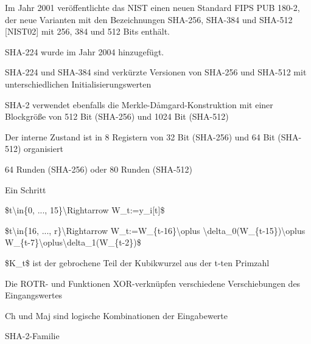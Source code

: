 \documentclass[a4paper]{article}
\begin{document}
\begin{multicols}{3}
\begin{itemize*}
            \begin{itemize*}
                  \item Im Jahr 2001 veröffentlichte das NIST einen neuen Standard FIPS PUB 180-2, der neue Varianten mit den Bezeichnungen SHA-256, SHA-384 und SHA-512 {[}NIST02{]} mit 256, 384 und 512 Bits enthält.
                  \begin{itemize*} \item SHA-224 wurde im Jahr 2004 hinzugefügt. \end{itemize*}
                  \item SHA-224 und SHA-384 sind verkürzte Versionen von SHA-256 und SHA-512 mit unterschiedlichen Initialisierungswerten
                  \item SHA-2 verwendet ebenfalls die Merkle-Dåmgard-Konstruktion mit einer Blockgröße von 512 Bit (SHA-256) und 1024 Bit (SHA-512)
                  \item Der interne Zustand ist in 8 Registern von 32 Bit (SHA-256) und 64 Bit (SHA-512) organisiert
                  \item 64 Runden (SHA-256) oder 80 Runden (SHA-512)
            \end{itemize*}
            \item
            Ein Schritt

            \begin{itemize*}
                  \item \$t\textbackslash in\{0, ..., 15\}\textbackslash Rightarrow W\_t:=y\_i{[}t{]}\$
                  \item \$t\textbackslash in\{16, ..., r\}\textbackslash Rightarrow W\_t:=W\_\{t-16\}\textbackslash oplus \textbackslash delta\_0(W\_\{t-15\})\textbackslash oplus W\_\{t-7\}\textbackslash oplus\textbackslash delta\_1(W\_\{t-2\})\$
                  \item \$K\_t\$ ist der gebrochene Teil der Kubikwurzel aus der t-ten Primzahl
                  \item Die ROTR- und Funktionen XOR-verknüpfen verschiedene Verschiebungen des Eingangswertes
                  \item Ch und Maj sind logische Kombinationen der Eingabewerte
            \end{itemize*}
            \item
            SHA-2-Familie


\end{itemize*}
\end{multicols}
\end{document}
